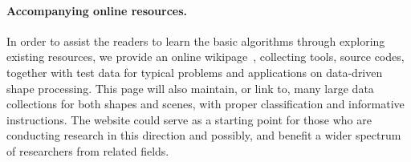 \paragraph*{Accompanying online resources.}
In order to assist the readers to learn the basic algorithms through exploring existing resources, we provide an online wikipage~\cite{Wikipage}, collecting tools, source codes, together with test data for typical problems and applications on data-driven shape processing. This page will also maintain, or link to, many large data collections for both shapes and scenes, with proper classification and informative instructions. The website could serve as a starting point for those who are conducting research in this direction and possibly, and benefit a wider spectrum of researchers from related fields. 